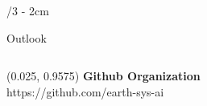 \documentclass[landscape]{uioposter}
\begin{document}
\begin{frame}
\begin{columns}[onlytextwidth]
\begin{column}{\textwidth/3 - 2cm}
\begin{block}{Outlook}
    \end{block}
\end{column}


\end{columns}


\begin{textblock}{0.5}(0.025, 0.9575)
    \color{white}
    \sffamily
    \textbf{Github Organization}
    \\
    https://github.com/earth-sys-ai
\end{textblock}


\end{frame}
\end{document}
